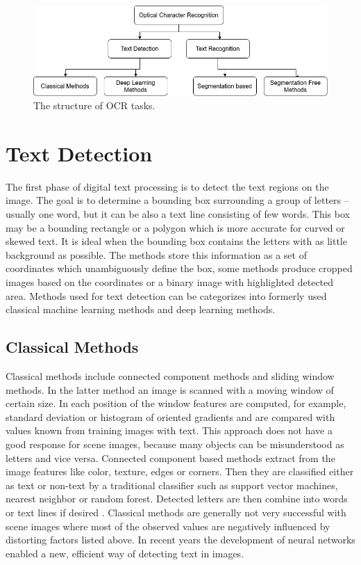 \begin{figure}[hbtp]
    \centering
    \includegraphics[scale=0.4]{obrazky/rozdeleni.png}
    \caption{The structure of OCR tasks.}
    \label{Im:rozdeleni}
\end{figure}

\section{Text Detection}

The first phase of digital text processing is to detect the text regions on the image. The goal is to determine a bounding box surrounding a group of letters -- usually one word, but it can be also a text line consisting of few words. This box may be a bounding rectangle or a polygon which is more accurate for curved or skewed text. It is ideal when the bounding box contains the letters with as little background as possible. The methods store this information as a set of coordinates which unambiguously define the box, some methods produce cropped images based on the coordinates or a binary image with highlighted detected area.%
Methods used for text detection can be categorizes into formerly used classical machine learning methods and deep learning methods. 

\subsection*{Classical Methods}

Classical methods include connected component methods and sliding window methods. In the latter method an image is scanned with a moving window of certain size. In each position of the window features are computed, for example, standard deviation or histogram of oriented gradients and are compared with values known from training images with text.    This approach does not have a good response for scene images, because many objects can be misunderstood as letters and vice versa. Connected component based methods extract from the image features like color, texture, edges or corners. Then they are classified either as text or non-text by a traditional classifier such as support vector machines, nearest neighbor or random forest. Detected letters are then combine into words or text lines if desired \cite{raisi2020text}. Classical methods are generally not very successful with scene images where most of the observed values are negatively influenced by distorting factors listed above. In recent years the development of neural networks enabled a new, efficient way of detecting text in images.


